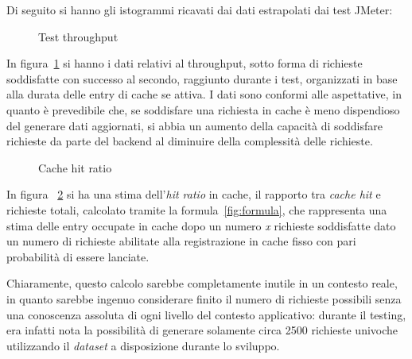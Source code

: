 Di seguito si hanno gli istogrammi ricavati dai dati estrapolati dai test JMeter: 
\begin{figure}[hbpt!]
\caption{Test throughput}
\label{fig:throughput}

\end{figure}
\FloatBarrier

In figura~\ref{fig:throughput} si hanno i dati relativi al throughput, sotto forma di richieste soddisfatte con successo al secondo, raggiunto durante i test, organizzati in base alla durata delle entry di cache se attiva.
I dati sono conformi alle aspettative, in quanto è prevedibile che, se soddisfare una richiesta in cache è meno dispendioso del generare dati aggiornati, si abbia un aumento della capacità di soddisfare richieste da parte del backend al diminuire della complessità delle richieste.



\begin{figure}[h!]

\caption{Cache hit ratio}
\label{fig:hitratio}

\end{figure}
\FloatBarrier
In figura ~\ref{fig:hitratio} si ha una stima dell'\textit{hit ratio} in cache, il rapporto tra \textit{cache hit} e richieste totali, calcolato tramite la formula~\ref{fig:formula}, che rappresenta una stima delle entry occupate in cache dopo un numero \emph{x} richieste soddisfatte dato un numero di richieste abilitate alla registrazione in cache fisso con pari probabilità di essere lanciate.

Chiaramente, questo calcolo sarebbe completamente inutile in un contesto reale, in quanto sarebbe ingenuo considerare finito il numero di richieste possibili senza una conoscenza assoluta di ogni livello del contesto applicativo: durante il testing, era infatti nota la possibilità di generare solamente circa 2500 richieste univoche utilizzando il \textit{dataset} a disposizione durante lo sviluppo.

